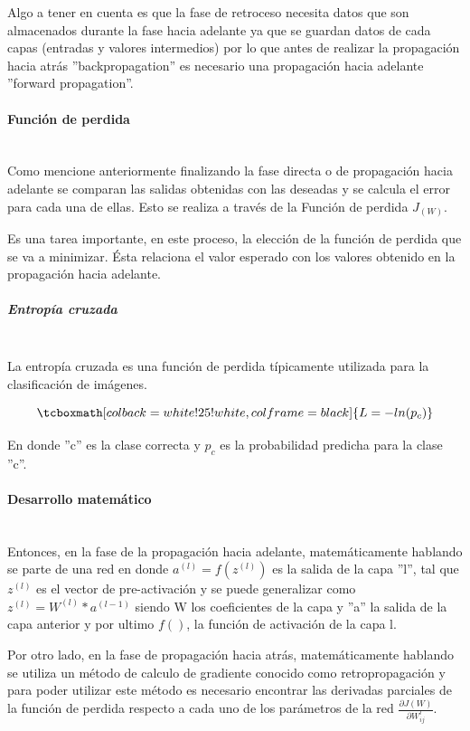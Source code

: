 Algo a tener en cuenta es que la fase de retroceso necesita datos que son almacenados durante la fase hacia adelante ya que se guardan datos de cada capas (entradas y valores intermedios) por lo que antes de realizar la propagación hacia atrás ''backpropagation'' es necesario una propagación hacia adelante ''forward propagation''. \par

\paragraph{Función de perdida}\mbox{}\\

Como mencione anteriormente finalizando la fase directa o de propagación hacia adelante se comparan las salidas obtenidas con las deseadas y se calcula el error para cada una de ellas. Esto se realiza a través de la Función de perdida $J_{(W)}$.\par
Es una tarea importante, en este proceso, la elección de la función de perdida que se va a minimizar. Ésta relaciona el valor esperado con los valores obtenido en la propagación hacia adelante.\par

\subparagraph{Entropía cruzada}\mbox{}\\

La entropía cruzada es una función de perdida típicamente utilizada para la clasificación de imágenes.\par

\begin{equation}
\tcboxmath[colback=white!25!white,colframe=black]
{ L = -ln(p_c) }  
\end{equation}

En donde ''c'' es la clase correcta y $p_c$ es la probabilidad predicha para la clase ''c''.\par

\paragraph{Desarrollo matemático}\mbox{}\\

Entonces, en la fase de la propagación hacia adelante, matemáticamente hablando se parte de una red en donde $a^{(l)}=f(z^{(l)})$ es la salida de la capa ''l'', tal que $z^{(l)}$ es el vector de pre-activación y se puede generalizar como $z^{(l)}=W^{(l)}*a^{(l-1)}$ siendo W los coeficientes de la capa y ''a'' la salida de la capa anterior y por ultimo $f()$, la función de activación de la capa l. \par
\bigbreak
Por otro lado, en la fase de propagación hacia atrás, matemáticamente hablando se utiliza un método de calculo de gradiente conocido como retropropagación y para poder utilizar este método es necesario encontrar las derivadas parciales de la función de perdida respecto a cada uno de los parámetros de la red $\frac{\partial J(W)}{\partial W^{l}_{ij}}$.\par

